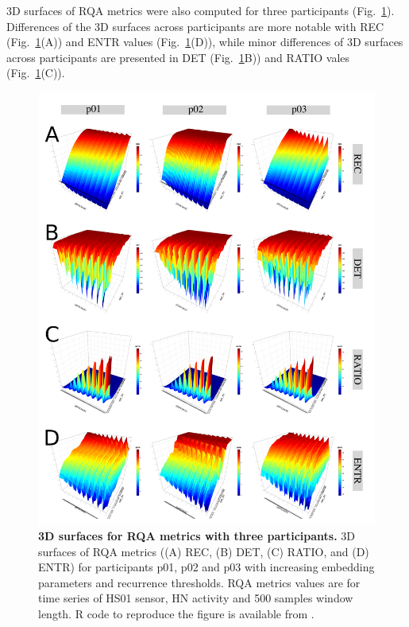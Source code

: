 3D surfaces of RQA metrics were also computed for three participants 
(Fig.~\ref{fig:topo_participants}).
Differences of the 3D surfaces across participants are more notable with 
REC (Fig.~\ref{fig:topo_participants}(A)) and 
ENTR values (Fig.~\ref{fig:topo_participants}(D)),
while minor differences of 3D surfaces across participants are 
presented in
DET (Fig.~\ref{fig:topo_participants}B)) and 
RATIO vales (Fig.~\ref{fig:topo_participants}(C)).
\begin{figure}[!ht]
\centering
\includegraphics[width=1.0\textwidth]{p}
    \caption{
	{\bf 3D surfaces for RQA metrics with three participants.}
	3D surfaces of RQA metrics ((A) REC, (B) DET, (C) RATIO, and (D) ENTR) 
	for participants p01, p02 and p03 with increasing embedding 
	parameters and recurrence thresholds.
	RQA metrics values are for time series of HS01 sensor, 
	HN activity and 500 samples window length.
	R code to reproduce the figure is available from \cite{hwum2018}.
 }
\label{fig:topo_participants}
\end{figure}



